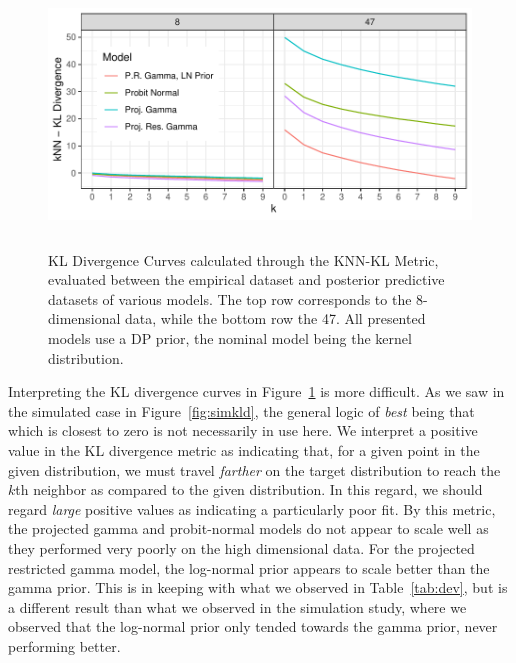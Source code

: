 \begin{figure}[ht]
  \centering
  \caption{KL Divergence Curves calculated through the KNN-KL Metric, evaluated between the
  empirical dataset and posterior predictive datasets of various models.  The top row corresponds
  to the 8-dimensional data, while the bottom row the 47.  All presented models use a DP prior,
  the nominal model being the kernel distribution.\label{fig:knnkl}}
  \includegraphics[width = 5.5in, height = 2.75in]{./images/knn_kld}
\end{figure}

Interpreting the KL divergence curves in Figure~\ref{fig:knnkl} is more difficult.  As we saw in
  the simulated case in Figure~\ref{fig:simkld}, the general logic of \emph{best} being that which
  is closest to zero is not necessarily in use here.  We interpret a positive value in the KL
  divergence metric as indicating that, for a given point in the given distribution, we must
  travel \emph{farther} on the target distribution to reach the $k$th neighbor as compared to
  the given distribution.  In this regard, we should regard \emph{large} positive values as
  indicating a particularly poor fit.  By this metric, the projected gamma and probit-normal
  models do not appear to scale well as they performed very poorly on the high dimensional data.
  For the projected restricted gamma model, the log-normal prior appears to scale better than the
  gamma prior.  This is in keeping with what we observed in Table~\ref{tab:dev}, but is a
  different result than what we observed in the simulation study, where we observed that the
  log-normal prior only tended towards the gamma prior, never performing better.

